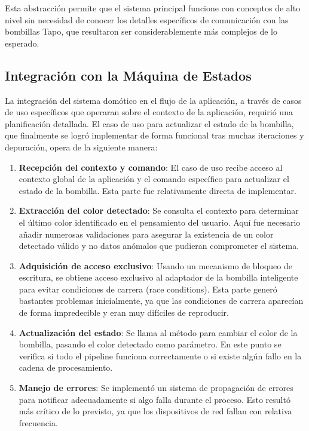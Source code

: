 Esta abstracción permite que el sistema principal funcione con conceptos de alto nivel sin necesidad de conocer los detalles específicos de comunicación con las bombillas Tapo, que resultaron ser considerablemente más complejos de lo esperado.

\subsection{Integración con la Máquina de Estados}

La integración del sistema domótico en el flujo de la aplicación, a través de casos de uso específicos que operaran sobre el contexto de la aplicación, requirió una planificación detallada. El caso de uso para actualizar el estado de la bombilla, que finalmente se logró implementar de forma funcional tras muchas iteraciones y depuración, opera de la siguiente manera:

\begin{enumerate}
    \item \textbf{Recepción del contexto y comando}: El caso de uso recibe acceso al contexto global de la aplicación y el comando específico para actualizar el estado de la bombilla. Esta parte fue relativamente directa de implementar.
    
    \item \textbf{Extracción del color detectado}: Se consulta el contexto para determinar el último color identificado en el pensamiento del usuario. Aquí fue necesario añadir numerosas validaciones para asegurar la existencia de un color detectado válido y no datos anómalos que pudieran comprometer el sistema.
    
    \item \textbf{Adquisición de acceso exclusivo}: Usando un mecanismo de bloqueo de escritura, se obtiene acceso exclusivo al adaptador de la bombilla inteligente para evitar condiciones de carrera (race conditions). Esta parte generó bastantes problemas inicialmente, ya que las condiciones de carrera aparecían de forma impredecible y eran muy difíciles de reproducir.
    
    \item \textbf{Actualización del estado}: Se llama al método para cambiar el color de la bombilla, pasando el color detectado como parámetro. En este punto se verifica si todo el pipeline funciona correctamente o si existe algún fallo en la cadena de procesamiento.
    
    \item \textbf{Manejo de errores}: Se implementó un sistema de propagación de errores para notificar adecuadamente si algo falla durante el proceso. Esto resultó más crítico de lo previsto, ya que los dispositivos de red fallan con relativa frecuencia.
\end{enumerate}

